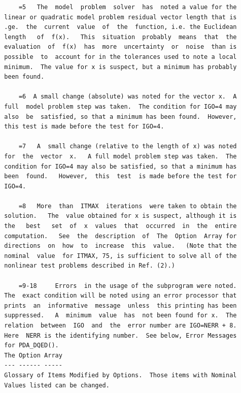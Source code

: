 \documentclass[11pt,twoside]{article}
\begin{document}
\begin{verbatim}
      =5   The  model  problem  solver  has  noted a value for the
  linear or quadratic model problem residual vector length that is
  .ge.  the  current  value  of  the  function, i.e. the Euclidean
  length   of  f(x).   This  situation  probably  means  that  the
  evaluation  of  f(x)  has  more  uncertainty  or  noise  than is
  possible  to  account for in the tolerances used to note a local
  minimum.  The value for x is suspect, but a minimum has probably
  been found.

      =6  A small change (absolute) was noted for the vector x.  A
  full  model problem step was taken.  The condition for IGO=4 may
  also  be  satisfied, so that a minimum has been found.  However,
  this test is made before the test for IGO=4.

      =7   A  small change (relative to the length of x) was noted
  for  the  vector  x.   A full model problem step was taken.  The
  condition for IGO=4 may also be satisfied, so that a minimum has
  been  found.   However,  this  test  is made before the test for
  IGO=4.

      =8   More  than  ITMAX  iterations  were taken to obtain the
  solution.   The  value obtained for x is suspect, although it is
  the   best   set  of  x  values  that  occurred  in  the  entire
  computation.   See  the  description  of  The  Option  Array for
  directions  on  how  to  increase  this  value.   (Note that the
  nominal  value  for ITMAX, 75, is sufficient to solve all of the
  nonlinear test problems described in Ref. (2).)

      =9-18     Errors  in the usage of the subprogram were noted.
  The  exact condition will be noted using an error processor that
  prints  an  informative  message  unless  this printing has been
  suppressed.   A  minimum  value  has  not been found for x.  The
  relation  between  IGO  and  the  error number are IGO=NERR + 8.
  Here  NERR is the identifying number.  See below, Error Messages
  for PDA_DQED().
  The Option Array
  --- ------ -----
  Glossary of Items Modified by Options.  Those items with Nominal
  Values listed can be changed.


\end{verbatim}
\end{document}
